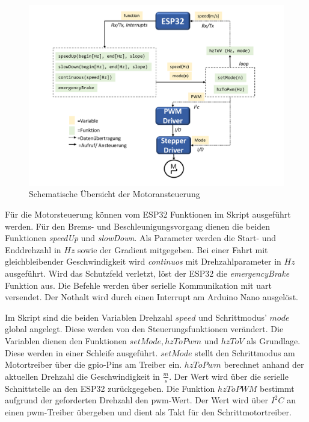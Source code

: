 \begin{figure}[h]
	\begin{center}
		\includegraphics[width=16cm]{motorsteuerung.pdf}
		\caption{Schematische Übersicht der Motoransteuerung}
		\label{pic:motorsteuerung}
	\end{center}
\end{figure}



Für die Motorsteuerung können vom ESP32 Funktionen im Skript ausgeführt werden. Für den Brems- und Beschleunigungsvorgang dienen die beiden Funktionen \textit{ speedUp} und \textit{slowDown}. Als Parameter werden die Start- und Enddrehzahl in $Hz$ sowie der Gradient mitgegeben. Bei einer Fahrt mit gleichbleibender Geschwindigkeit wird \textit{continuos} mit Drehzahlparameter in $Hz$ ausgeführt. Wird das Schutzfeld verletzt, löst der ESP32 die \textit{emergencyBrake} Funktion aus. Die Befehle werden über serielle Kommunikation mit \acrshort{uart} versendet. Der Nothalt wird durch einen Interrupt am Arduino Nano ausgelöst. \\
\newpage

Im Skript sind die beiden Variablen Drehzahl $speed$ und Schrittmodus' $mode$ global angelegt. Diese werden von den Steuerungsfunktionen verändert. Die Variablen dienen den Funktionen $setMode, hzToPwm$ und $hzToV$ als Grundlage. Diese werden in einer Schleife ausgeführt. $setMode$ stellt den Schrittmodus am Motortreiber über die \acrshort{gpio}-Pins am  Treiber ein. $hzToPwm$ berechnet anhand der aktuellen Drehzahl die Geschwindigkeit in $\frac{m}{s}$. Der Wert wird über die serielle Schnittstelle an den ESP32 zurückgegeben. Die Funktion $hzToPWM$ bestimmt aufgrund der geforderten Drehzahl den \acrshort{pwm}-Wert. Der Wert wird über $I^2C$ an einen  \acrshort{pwm}-Treiber übergeben und dient als Takt für den Schrittmotortreiber. \\

